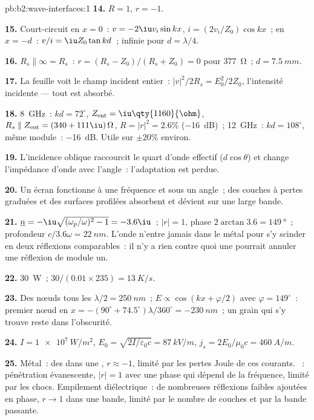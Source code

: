 \begin{solution}{pb:b2:wave-interfaces:1}
\textbf{14.} $R = 1$, $r = -1$.

\textbf{15.} Court-circuit en $x = 0$~: $v = -2\iu v_i\sin kx$, $i = (2v_i/Z_0)\cos kx$~;
en $x = -d$~: $v/i = \iu Z_0\tan kd$~; infinie pour $d = \lambda/4$.

\textbf{16.} $R_s \parallel \infty = R_s$~: $r = (R_s - Z_0)/(R_s + Z_0) = 0$ pour
\qty{377}{\ohm}~; $d = \qty{7.5}{mm}$.

\textbf{17.} La feuille voit le champ incident entier~: $|v|^2/2R_s =
E_0^2/2Z_0$, l'intensité incidente --- tout est absorbé.

\textbf{18.} \qty{8}{GHz}~: $kd = 72^\circ$, $Z_{\text{ent}} = \iu\qty{1160}{\ohm}$, $R_s \parallel
Z_{\text{ent}} = (340 + 111\iu)\,\Omega$, $R = |r|^2 = 2.6\%$ (\qty{-16}{dB})~; \qty{12}{GHz}~:
$kd = 108^\circ$, même module~: \qty{-16}{dB}. Utile sur $\pm20\%$ environ.

\textbf{19.} L'incidence oblique raccourcit le quart d'onde effectif
($d\cos\theta$) et change l'impédance d'onde avec l'angle~: l'adaptation
est perdue.

\textbf{20.} Un écran fonctionne à une fréquence et sous un angle~; des couches
à pertes graduées et des surfaces profilées absorbent et dévient sur une large bande.

\textbf{21.} $\underline n = -\iu\sqrt{(\omega_p/\omega)^2 - 1} = -3.6\iu$~; $|r| = 1$, phase
$2\arctan3.6 = \qty{149}{\degree}$~; profondeur $c/3.6\omega = \qty{22}{nm}$. L'onde n'entre jamais
dans le métal pour s'y scinder en deux réflexions comparables~: il n'y a
rien contre quoi une  pourrait annuler une réflexion de module un.

\textbf{22.} \qty{30}{W}~; $30/(0.01 \times 235) = \qty{13}{K/s}$.

\textbf{23.} Des nœuds tous les $\lambda/2 = \qty{250}{nm}$~; $E \propto \cos(kx + \varphi/2)$ avec $\varphi =
149^\circ$~: premier nœud en $x = -(90^\circ + 74.5^\circ)\lambda/360^\circ = \qty{-230}{nm}$~; un
grain qui s'y trouve reste dans l'obscurité.

\textbf{24.} $I = \qty{1e7}{W/m^2}$, $E_0 = \sqrt{2I/\varepsilon_0c} = \qty{87}{kV/m}$, $j_s =
2E_0/\mu_0c = \qty{460}{A/m}$.

\textbf{25.} Métal~: des  dans une , $r \approx -1$, limité
par les pertes Joule de ces courants. ~: pénétration évanescente,
$|r| = 1$ avec une phase qui dépend de la fréquence, limité par les chocs.
Empilement diélectrique~: de nombreuses réflexions faibles ajoutées en phase, $r \to 1$ dans une
bande, limité par le nombre de couches et par la bande passante.
\end{solution}
